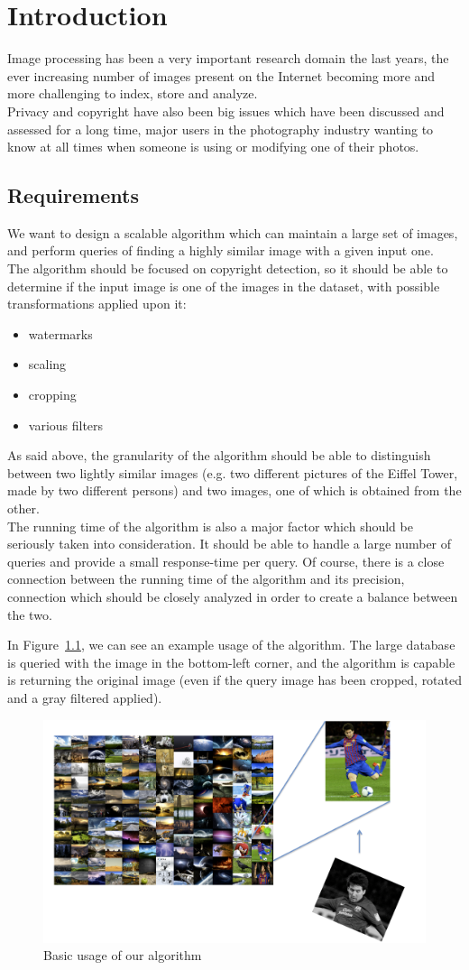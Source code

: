 \chapter{Introduction}

Image processing has been a very important research domain the last years, the ever increasing number of images present on the Internet becoming more and more challenging to index, store and analyze.\\
Privacy and copyright have also been big issues which have been discussed and assessed for a long time, major users in the photography industry wanting to know at all times when someone is using or modifying one of their photos.

\section{Requirements}

We want to design a scalable algorithm which can maintain a large set of images, and perform queries of finding a highly similar image with a given input one. \\
The algorithm should be focused on copyright detection, so it should be able to determine if the input image is one of the images in the dataset, with possible transformations applied upon it:
\begin{itemize}
	\item watermarks
	\item scaling
	\item cropping
	\item various filters
\end{itemize}

As said above, the granularity of the algorithm should be able to distinguish between two lightly similar images (e.g. two different pictures of the Eiffel Tower, made by two different persons) and two images, one of which is obtained from the other.\\

The running time of the algorithm is also a major factor which should be seriously taken into consideration. It should be able to handle a large number of queries and provide a small response-time per query. Of course, there is a close connection between the running time of the algorithm and its precision, connection which should be closely analyzed in order to create a balance between the two.

In Figure~\ref{fig:basicUsage}, we can see an example usage of the algorithm. The large database is queried with the image in the bottom-left corner, and the algorithm is capable is returning the original image (even if the query image has been cropped, rotated and a gray filtered applied).

\begin{figure}[ht!]
\centering
\includegraphics[width=.8\linewidth]{images/basicUsage.png}
\caption{Basic usage of our algorithm}
\label{fig:basicUsage}
\end{figure}